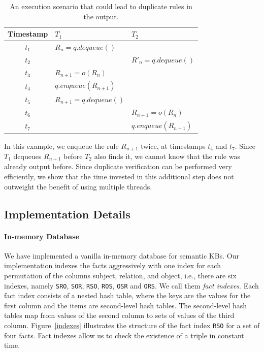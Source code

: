 \begin{table}
\centering
 \begin{tabular}{c|l|l}
  Timestamp & $T_1$ & $T_2$\\  \hline
  $t_1$ & $R_n = q.dequeue()$	&  \\
  $t_2$ & & $R'_n = q.dequeue()$ \\
  $t_3$ & $R_{n+1} = o(R_n)$  & \\
  $t_4$ & $q.enqueue(R_{n+1})$  & \\
  $t_5$ & $R_{n+1} = q.dequeue()$ & \\
  $t_6$ & & $R_{n+1} = o(R_n)$ \\
  $t_7$ & & $q.enqueue(R_{n+1})$ \\
\end{tabular}
\caption{An execution scenario that could lead to duplicate rules in the output.}\label{tab:duplicates}
\end{table}

In this example, we enqueue the rule $R_{n+1}$ twice, at timestamps $t_4$ and $t_7$. 
Since $T_1$ dequeues $R_{n+1}$ before $T_2$ also finds it, 
we cannot know that the rule was already output before. 
Since duplicate verification
can be performed very efficiently, we show that the time invested in this additional step does not  
outweight the benefit of using multiple threads.



\subsection{Implementation Details}
\label{subsec:implementation}

\paragraph{In-memory Database}
We have implemented a vanilla in-memory database for semantic KBs.
Our implementation indexes the facts aggressively with one index for each permutation of 
the columns subject, relation, and object, i.e., there are six indexes, namely \texttt{SRO}, \texttt{SOR}, 
\texttt{RSO}, \texttt{ROS}, \texttt{OSR} and \texttt{ORS}. We call them \emph{fact indexes}.
Each fact index consists of a nested hash table, where the keys are the values for the first column and the items
are second-level hash tables. The second-level hash tables map from values of the second column
to sets of values of the third column. 
Figure~\ref{indexes} illustrates the structure of the fact index \texttt{RSO} for a set of four facts.
Fact indexes allow us to check the existence of a triple in constant time.

